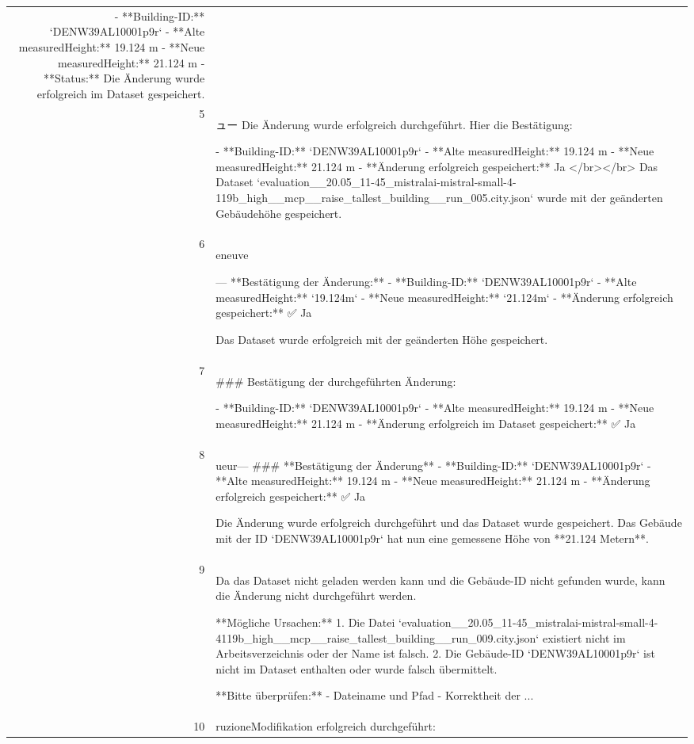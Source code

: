 \documentclass[a4paper,11pt]{article}
\begin{document}
\begin{table}[ht]
\begin{tabular}{r p{12cm}}
- **Building-ID:** `DENW39AL10001p9r`
- **Alte measuredHeight:** 19.124 m
- **Neue measuredHeight:** 21.124 m
- **Status:** Die Änderung wurde erfolgreich im Dataset gespeichert. \\
5 & ュー
Die Änderung wurde erfolgreich durchgeführt. Hier die Bestätigung:

- **Building-ID:** `DENW39AL10001p9r`
- **Alte measuredHeight:** 19.124 m
- **Neue measuredHeight:** 21.124 m
- **Änderung erfolgreich gespeichert:** Ja
</br></br>
Das Dataset `evaluation\_\_20.05\_11-45\_mistralai-mistral-small-4-119b\_high\_\_mcp\_\_raise\_tallest\_building\_\_run\_005.city.json` wurde mit der geänderten Gebäudehöhe gespeichert. \\
6 & eneuve

---
**Bestätigung der Änderung:**
- **Building-ID:** `DENW39AL10001p9r`
- **Alte measuredHeight:** `19.124m`
- **Neue measuredHeight:** `21.124m`
- **Änderung erfolgreich gespeichert:** ✅ Ja

Das Dataset wurde erfolgreich mit der geänderten Höhe gespeichert. \\
7 & \#\#\# Bestätigung der durchgeführten Änderung:

- **Building-ID:** `DENW39AL10001p9r`
- **Alte measuredHeight:** 19.124 m
- **Neue measuredHeight:** 21.124 m
- **Änderung erfolgreich im Dataset gespeichert:** ✅ Ja \\
8 & ueur---
\#\#\# **Bestätigung der Änderung**
- **Building-ID:** `DENW39AL10001p9r`
- **Alte measuredHeight:** 19.124 m
- **Neue measuredHeight:** 21.124 m
- **Änderung erfolgreich gespeichert:** ✅ Ja

Die Änderung wurde erfolgreich durchgeführt und das Dataset wurde gespeichert. Das Gebäude mit der ID `DENW39AL10001p9r` hat nun eine gemessene Höhe von **21.124 Metern**. \\
9 & Da das Dataset nicht geladen werden kann und die Gebäude-ID nicht gefunden wurde, kann die Änderung nicht durchgeführt werden.

**Mögliche Ursachen:**
1. Die Datei `evaluation\_\_20.05\_11-45\_mistralai-mistral-small-4-4119b\_high\_\_mcp\_\_raise\_tallest\_building\_\_run\_009.city.json` existiert nicht im Arbeitsverzeichnis oder der Name ist falsch.
2. Die Gebäude-ID `DENW39AL10001p9r` ist nicht im Dataset enthalten oder wurde falsch übermittelt.

**Bitte überprüfen:**
- Dateiname und Pfad
- Korrektheit der ... \\
10 & ruzioneModifikation erfolgreich durchgeführt:


\end{tabular}
\end{table}
\end{document}
